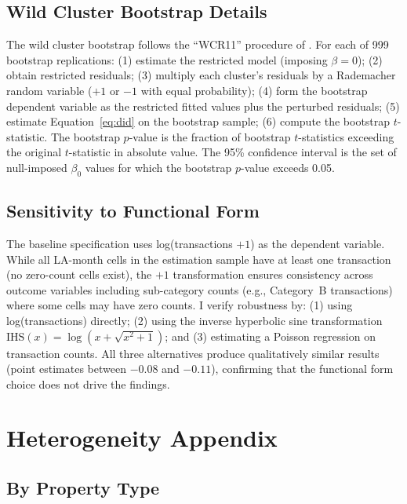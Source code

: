 \documentclass[12pt]{article}
\begin{document}
\subsection{Wild Cluster Bootstrap Details}

The wild cluster bootstrap follows the ``WCR11'' procedure of \citet{cameron2008bootstrap}. For each of 999 bootstrap replications: (1) estimate the restricted model (imposing $\beta = 0$); (2) obtain restricted residuals; (3) multiply each cluster's residuals by a Rademacher random variable ($+1$ or $-1$ with equal probability); (4) form the bootstrap dependent variable as the restricted fitted values plus the perturbed residuals; (5) estimate Equation~\ref{eq:did} on the bootstrap sample; (6) compute the bootstrap $t$-statistic. The bootstrap $p$-value is the fraction of bootstrap $t$-statistics exceeding the original $t$-statistic in absolute value. The 95\% confidence interval is the set of null-imposed $\beta_0$ values for which the bootstrap $p$-value exceeds 0.05.

\subsection{Sensitivity to Functional Form}

The baseline specification uses log(transactions $+ 1$) as the dependent variable. While all LA-month cells in the estimation sample have at least one transaction (no zero-count cells exist), the $+1$ transformation ensures consistency across outcome variables including sub-category counts (e.g., Category~B transactions) where some cells may have zero counts. I verify robustness by: (1) using log(transactions) directly; (2) using the inverse hyperbolic sine transformation $\text{IHS}(x) = \log(x + \sqrt{x^2 + 1})$; and (3) estimating a Poisson regression on transaction counts. All three alternatives produce qualitatively similar results (point estimates between $-0.08$ and $-0.11$), confirming that the functional form choice does not drive the findings.


\section{Heterogeneity Appendix}
\label{app:heterogeneity}

\subsection{By Property Type}
\end{document}
